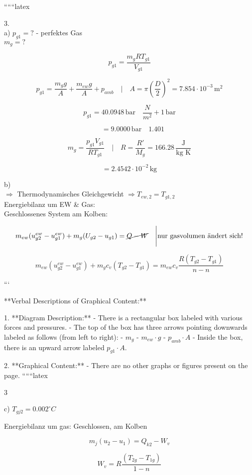 
``````latex


3. \\
a) $p_{g1} = ?$ \quad - perfektes Gas \\
\quad $m_g = ?$

\[
p_{g1} = \frac{m_g R T_{g1}}{V_{g1}}
\]

\[
p_{g1} = \frac{m_g g}{A} + \frac{m_{ew} g}{A} + p_{amb} \quad \Bigg| \quad A = \pi \left(\frac{D}{2}\right)^2 = 7.854 \cdot 10^{-3} \, \text{m}^2
\]

\[
p_{g1} = 40.0948 \, \text{bar} \quad \frac{N}{m^2} + 1 \, \text{bar}
\]

\[
\quad = 9.0000 \, \text{bar} \quad 1.401
\]

\[
m_g = \frac{p_{g1} V_{g1}}{R T_{g1}} \quad \Bigg| \quad R = \frac{R'}{M_g} = 166.28 \, \frac{\text{J}}{\text{kg K}}
\]

\[
= 2.4542 \cdot 10^{-2} \, \text{kg}
\]

b) \\
\quad $\Rightarrow$ Thermodynamisches Gleichgewicht $\Rightarrow T_{ew,2} = T_{g1,2}$ \\
\quad Energiebilanz um EW \& Gas: \\
\quad Geschlossenes System am Kolben:

\[
m_{ew} (u_{g2}^{ew} - u_{g1}^{ew}) + m_g (U_{g2} - u_{g1}) = \cancel{Q - W} \quad \Bigg| \text{nur gasvolumen ändert sich!}
\]

\[
m_{ew} (u_{g2}^{ew} - u_{g1}^{ew}) + m_g c_v (T_{g2} - T_{g1}) = m_{ew} c_v \frac{R (T_{g2} - T_{g1})}{n - n}
\]

```

**Verbal Descriptions of Graphical Content:**

1. **Diagram Description:**
   - There is a rectangular box labeled with various forces and pressures.
   - The top of the box has three arrows pointing downwards labeled as follows (from left to right):
     - $m_g$
     - $m_{ew} \cdot g$
     - $p_{amb} \cdot A$
   - Inside the box, there is an upward arrow labeled $p_{g1} \cdot A$.

2. **Graphical Content:**
   - There are no other graphs or figures present on the page.
``````latex


3

c) \( T_{gj2} = 0.002^\circ C \)

Energiebilanz um gas: Geschlossen, am Kolben

\[
m_j (u_2 - u_1) = Q_{k2} - W_v
\]

\[
W_v = R \frac{(T_{2g} - T_{1g})}{1 - n}
\]

